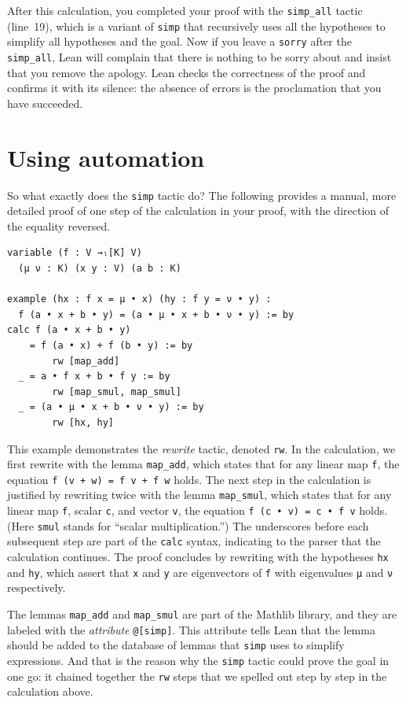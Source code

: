 \documentclass[11pt]{article}
\def\lean{\lstinline[language=lean]}
\begin{document}
After this calculation,
you completed your proof with the \lean"simp_all" tactic (line~19),
which is a variant of \lean"simp" that recursively uses all the hypotheses to simplify all hypotheses and the goal.
Now if you leave a \lean"sorry" after the \lean"simp_all",
Lean will complain that there is nothing to be sorry about
and insist that you remove the apology.
Lean checks the correctness of the proof and confirms it with its silence:
the absence of errors is the proclamation that you have succeeded.

\section*{Using automation}

So what exactly does the \lean"simp" tactic do?
The following provides a manual, more detailed proof of one step of the calculation in your proof, with the direction of the equality reversed.
\begin{lstlisting}
variable (f : V →ₗ[K] V)
  (μ ν : K) (x y : V) (a b : K)

example (hx : f x = μ • x) (hy : f y = ν • y) :
  f (a • x + b • y) = (a • μ • x + b • ν • y) := by
calc f (a • x + b • y)
    = f (a • x) + f (b • y) := by
        rw [map_add]
  _ = a • f x + b • f y := by
        rw [map_smul, map_smul]
  _ = (a • μ • x + b • ν • y) := by
        rw [hx, hy]
\end{lstlisting}
This example demonstrates the \emph{rewrite} tactic, denoted \lean"rw".
In the calculation, we first rewrite with the lemma \lean"map_add",
which states that for any linear map \lean"f",
the equation \lean"f (v + w) = f v + f w" holds.
The next step in the calculation is justified
by rewriting twice with the lemma \lean"map_smul",
which states that for any linear map \lean"f", scalar \lean"c", and vector \lean"v",
the equation \lean"f (c • v) = c • f v" holds.
(Here \lean"smul" stands for ``scalar multiplication.'')
The underscores before each subsequent step are part of the \lstinline{calc}
syntax, indicating to the parser that the calculation continues.
The proof concludes by rewriting with the hypotheses \lean"hx" and \lean"hy",
which assert that \lean"x" and \lean"y" are eigenvectors of \lean"f" with eigenvalues \lean"μ" and \lean"ν" respectively.

The lemmas \lean"map_add" and \lean"map_smul" are part of the Mathlib library,
and they are labeled with the \emph{attribute} \lean{@[simp]}.
This attribute tells Lean that the lemma should be added to the database of lemmas that \lean"simp" uses to simplify expressions.
And that is the reason why the \lean"simp" tactic could prove the goal in one go:
it chained together the \lean"rw" steps that we spelled out step by step in the calculation above.
\end{document}
